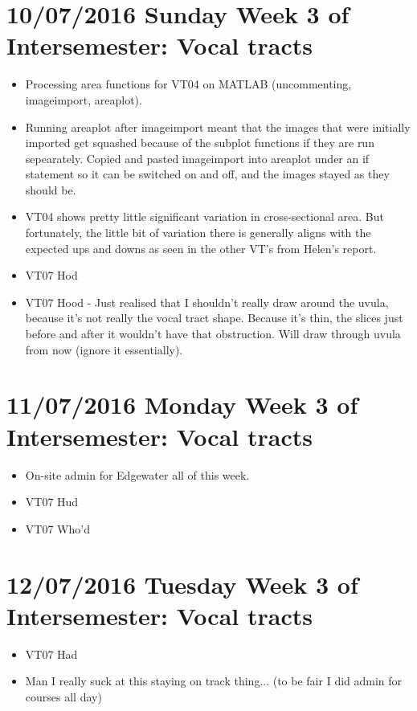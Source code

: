 \documentclass{article}
\begin{document}
\section*{10/07/2016 Sunday Week 3 of Intersemester: Vocal tracts}
\begin{itemize}
    \item Processing area functions for VT04 on MATLAB (uncommenting, imageimport, areaplot).
    \item Running areaplot after imageimport meant that the images that were initially imported get squashed because of the subplot functions if they are run sepearately. Copied and pasted imageimport into areaplot under an if statement so it can be switched on and off, and the images stayed as they should be.
    \item VT04 shows pretty little significant variation in cross-sectional area. But fortunately, the little bit of variation there is generally aligns with the expected ups and downs as seen in the other VT's from Helen's report.
    \item VT07 Hod
    \item VT07 Hood - Just realised that I shouldn't really draw around the uvula, because it's not really the vocal tract shape. Because it's thin, the slices just before and after it wouldn't have that obstruction. Will draw through uvula from now (ignore it essentially).
\end{itemize}

\section*{11/07/2016 Monday Week 3 of Intersemester: Vocal tracts}
\begin{itemize}
    \item On-site admin for Edgewater all of this week.
    \item VT07 Hud
    \item VT07 Who'd
\end{itemize}

\section*{12/07/2016 Tuesday Week 3 of Intersemester: Vocal tracts}
\begin{itemize}
    \item VT07 Had
    \item Man I really suck at this staying on track thing... (to be fair I did admin for courses all day)
\end{itemize}
\end{document}
